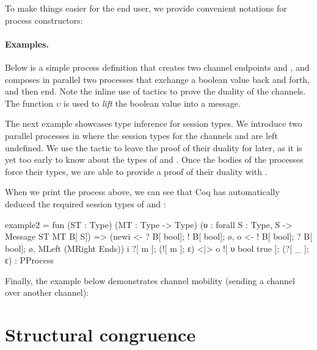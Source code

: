 \documentclass{mproj}
\begin{document}

To make things easier for the end user, we provide convenient notations for process constructors:


\paragraph{Examples.} Below is a simple process definition that creates two channel endpoints  and , and composes in parallel two processes that exchange a boolean value back and forth, and then end. Note the inline use of tactics to prove the duality of the channels. The function $\upsilon$ is used to \emph{lift} the boolean value  into a message.


The next example showcases type inference for session types. We introduce two parallel processes in where the session types for the channels  and  are left undefined. We use the tactic  to leave the proof of their duality for later, as it is yet too early to know about the types of  and . Once the bodies of the processes force their types, we are able to provide a proof of their duality with .


When we print the process above, we can see that Coq has automatically deduced the required session types of  and :

\begin{coq}
example2 = 
fun (ST : Type) (MT : Type -> Type) (υ : forall S : Type, S -> Message ST MT B[ S]) =>
(newi <- ? B[ bool]; ! B[ bool]; ø, o <- ! B[ bool]; ? B[ bool]; ø,
MLeft (MRight Ends)) i ?[ m ]; (![ m ]; ε) <|> o ![ υ bool true ]; (?[ _ ]; ε)
     : PProcess
\end{coq}

Finally, the example below demonstrates channel mobility (sending a channel over another channel):


\section{Structural congruence}\label{structural-congruence}
\end{document}
